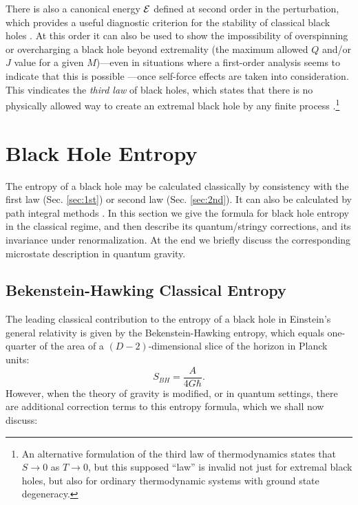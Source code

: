 \documentclass[12pt,a4paper]{article}
\def\be{\begin{equation}}
\def\ee{\end{equation}}
\begin{document}

There is also a canonical energy $\cal E$ defined at second order in the perturbation, which provides a useful diagnostic criterion for the stability of classical black holes \cite{Hollands:2012sf}. At this order it can also be used to show the impossibility \cite{sorce} of overspinning or overcharging a black hole beyond extremality (the maximum allowed $Q$ and/or $J$ value for a given $M$)---even in situations where a first-order analysis seems to indicate that this is possible \cite{Hubeny:1998ga,Jacobson:2009kt}---once self-force effects are taken into consideration\cite{Zimmerman:2012zu,Barausse:2010ka,Colleoni:2015ena}.  This vindicates the \emph{third law} of black holes, which states that there is no physically allowed way to create an extremal black hole by any finite process \cite{bardeen1973four,israel}.\footnote{An alternative formulation of the third law of thermodynamics states that $S \to 0$ as $T \to 0$, but this supposed ``law'' is invalid not just for extremal black holes, but also for ordinary thermodynamic systems with ground state degeneracy.}

\section{Black Hole Entropy}\label{sec:BHent} 

The entropy of a black hole may be calculated classically by consistency with the first law (Sec. \ref{sec:1st}) or second law (Sec. \ref{sec:2nd}).  It can also be calculated by path integral methods \cite{gibbons1977action, lewkowycz}.  In this section we give the formula for black hole entropy in the classical regime, and then describe its quantum/stringy corrections, and its invariance under renormalization.  At the end we briefly discuss the corresponding microstate description in quantum gravity.

\subsection{Bekenstein-Hawking Classical Entropy}

The leading classical contribution to the entropy of a black hole in Einstein's general relativity is given by the Bekenstein-Hawking entropy, which equals one-quarter of the area of a $(D-2)$-dimensional slice of the horizon in Planck units:
\be
S_{BH} = \frac{A}{4G \hbar}.
\ee
However, when the theory of gravity is modified, or in quantum settings, there are additional correction terms to this entropy formula, which we shall now discuss:
\end{document}
